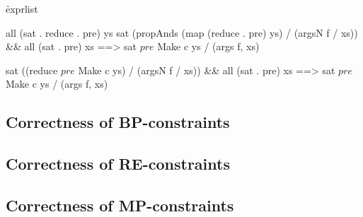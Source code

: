 \h{exprlist}\begin{code}
all (sat . reduce . pre) ys sat (propAnds (map (reduce . pre) ys) / (argsN f / xs)) && all (sat . pre) xs ==> sat $ pre $ Make c ys / (args f, xs)

sat ((reduce $ pre $ Make c ys) / (argsN f / xs)) && all (sat . pre) xs ==> sat $ pre $ Make c ys / (args f, xs)
\end{code}



\subsection{Correctness of BP-constraints}


\subsection{Correctness of RE-constraints}


\subsection{Correctness of MP-constraints}

